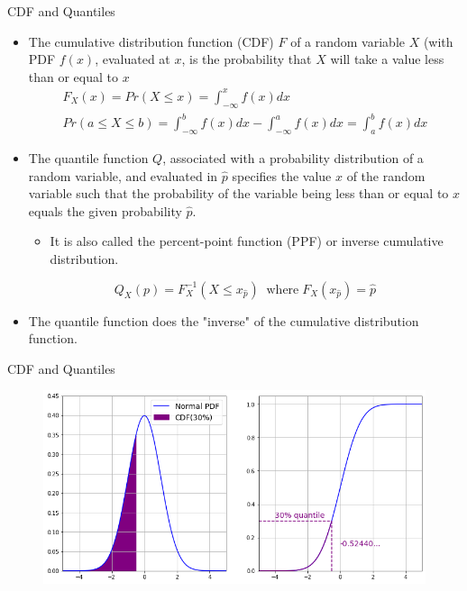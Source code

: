 \documentclass{beamer}
\begin{document}
\begin{frame}{CDF and Quantiles}
	\begin{itemize}
    \item The cumulative distribution function (CDF) $F$ of a random variable $X$ (with PDF $f(x)$, evaluated at $x$, is the probability that $X$ will take a value less than or equal to $x$
    \begin{equation*}
        \begin{gathered}
            F_X(x) = Pr(X\leq x) = \int_{-\infty}^{x} f(x)dx\\
            Pr(a \leq X\leq b) = \int_{-\infty}^{b} f(x)dx - \int_{-\infty}^{a} f(x)dx = \int_{a}^{b} f(x)dx
        \end{gathered}
    \end{equation*}
    
    \item The quantile function $Q$, associated with a probability distribution of a random variable, and evaluated in $\hat{p}$ specifies the value $x$ of the random variable such that the probability of the variable being less than or equal to $x$ equals the given probability $\hat{p}$. 
    \begin{itemize}
        \item It is also called the percent-point function (PPF) or inverse cumulative distribution.
    \end{itemize}
    \begin{equation*}    
        Q_X(p) = F_X^{-1}(X \leq x_{\hat{p}})\;\;\textrm{where}\; F_X(x_{\hat{p}}) = \hat{p}
    \end{equation*}
    
    \item The quantile function does the "inverse" of the cumulative distribution function.
	\end{itemize}
\end{frame}

\begin{frame}{CDF and Quantiles}
    \begin{figure}[h]
    \begin{center}
    \includegraphics[width=0.7\linewidth]{cdf_quantiles}
    \end{center}
    \end{figure}    
\end{frame}
\end{document}
